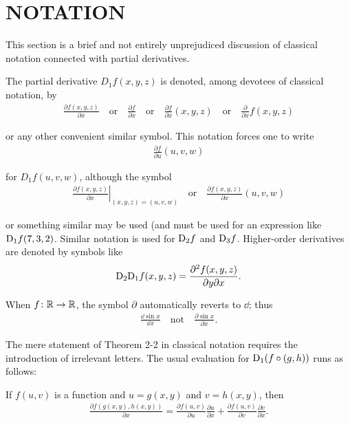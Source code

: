 \clearpage
\section[\textsc{notation}]{NOTATION}
This section is a brief and not entirely unprejudiced discussion
of classical notation connected with partial derivatives.

The partial derivative $D_1f(x,y,z)$ is denoted, among devotees
of classical notation, by
\begin{align*}
    \frac{\partial f(x,y,z)}{\partial x}
    \quad\mathrm{or}\quad
    \frac{\partial f}{\partial x}
    \quad\mathrm{or}\quad
    \frac{\partial f}{\partial x}(x,y,z)
    \quad\mathrm{or}\quad
    \frac\partial{\partial x}f(x,y,z)
\end{align*}

or any other convenient similar symbol. This notation forces
one to write
\begin{align*}
    \frac{\partial f }{\partial u}(u,v,w)
\end{align*}

for $D_1f(u, v, w)$, although the symbol 
\begin{align*}
    \left.\frac{\partial f(x,y,z)}{\partial x}\right|_{(x,y,z)=(u,v,w)}
    \quad\mathrm{or}\quad
    \frac{\partial f(x,y,z)}{\partial x}\left(u,v,w\right)
\end{align*}

or something similar may be used (and must be used for an
expression like $\mathrm{D}_1f(7,3,2)$. Similar notation is used for $\mathrm{D}_2f$
and $\mathrm{D}_3f$. Higher-order derivatives are denoted by symbols
like
\begin{align*}
    \mathrm{D}_2\mathrm{D}_1f(x,y,z)=\frac{\partial^2f(x,y,z)}{\partial y\partial x}.
\end{align*}

When $f\colon{}\mathbb{R}\to \mathbb{R}$, the symbol $\partial$ automatically reverts to $\dd$; thus
\begin{align*}
    \frac{\dd\sin x}{\dd x}
    \quad\mathrm{not}\quad
    \frac{\partial\sin x}{\partial x}.
\end{align*}

The mere statement of Theorem 2-2 in classical notation
requires the introduction of irrelevant letters. The usual
evaluation for $\mathrm{D}_1(f\circ(g, h))$ runs as follows:

If $f(u,v)$ is a function and $u=g(x, y)$ and $v=h(x, y)$, then
\begin{align*}
    \frac{\partial f(g(x,y),h(x,y))}{\partial x}
    =
    \frac{\partial f(u,v)}{\partial u}\frac{\partial u}{\partial x}+\frac{\partial f(u,v)}{\partial v}\frac{\partial v}{\partial x}.
\end{align*}

